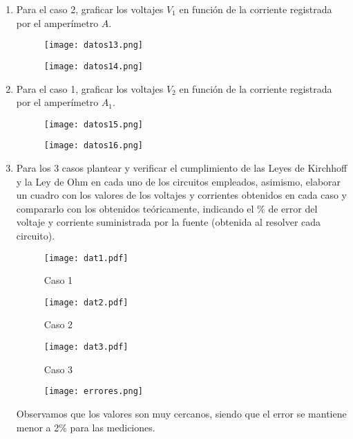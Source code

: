 \documentclass[a4paper,12pt]{report}
\begin{document}
\begin{enumerate}
\begin{figure}[H]
\end{figure}
\item Para el caso 2, graficar los voltajes $V_{1}$ en función de la corriente registrada por el amperímetro $A$.
\begin{figure}[H]
\centering
\texttt{[image: datos13.png]}
\end{figure}
\begin{figure}[H]
\centering
\texttt{[image: datos14.png]}
\end{figure}
\item Para el caso 1, graficar los voltajes $V_{2}$ en función de la corriente registrada por el amperímetro $A_{1}$.
\begin{figure}[H]
\centering
\texttt{[image: datos15.png]}
\end{figure}
\begin{figure}[H]
\centering
\texttt{[image: datos16.png]}
\end{figure}
\item Para los 3 casos plantear y verificar el cumplimiento de las Leyes de Kirchhoff y la Ley de Ohm en cada uno de los circuitos empleados, asimismo, elaborar un cuadro con los valores de los voltajes y corrientes obtenidos en cada caso y compararlo con los obtenidos teóricamente, indicando el \% de error del voltaje y corriente suministrada por la fuente (obtenida al resolver cada circuito).
\begin{figure}[H]
\centering
\texttt{[image: dat1.pdf]}
\caption{Caso 1}
\end{figure}
\begin{figure}[H]
\centering
\texttt{[image: dat2.pdf]}
\caption{Caso 2}
\end{figure}
\begin{figure}[H]
\centering
\texttt{[image: dat3.pdf]}
\caption{Caso 3}
\end{figure}
\begin{figure}[H]
\centering
\texttt{[image: errores.png]}
\end{figure}
Observamos que los valores son muy cercanos, siendo que el error se mantiene menor a 2\% para las mediciones.
\end{enumerate}
\end{document}
